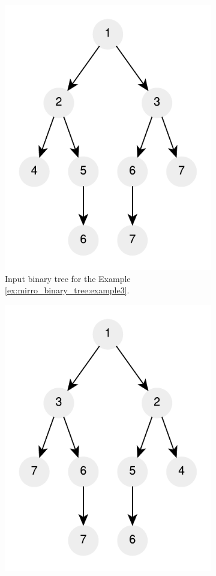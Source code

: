 \begin{figure}
	\centering
	\begin{subfigure}[b]{0.4\textwidth}
		\includegraphics[]{sources/mirror_binary_tree/images/example3}
		\caption{Input binary tree for the Example \ref{ex:mirro_binary_tree:example3}.}
		\label{fig:mirro_binary_tree:example3}
	 \end{subfigure}
	 \hfill
	 \begin{subfigure}[b]{0.4\textwidth}
		\includegraphics[]{sources/mirror_binary_tree/images/example3_1}

\end{subfigure}
\end{figure}
